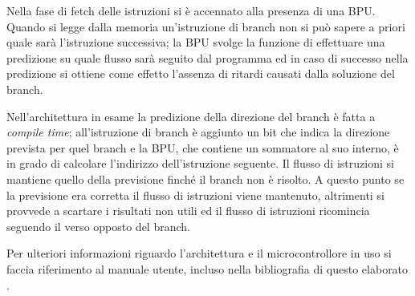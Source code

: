 Nella fase di fetch delle istruzioni si è accennato alla presenza di una BPU. Quando si legge dalla memoria un'istruzione di branch non si può sapere a priori quale sarà l'istruzione successiva; la BPU svolge la funzione di effettuare una predizione su quale flusso sarà seguito dal programma ed in caso di successo nella predizione si ottiene come effetto l'assenza di ritardi causati dalla soluzione del branch.

Nell'architettura in esame la predizione della direzione del branch è fatta a \textit{compile time}; all'istruzione di branch è aggiunto un bit che indica la direzione prevista per quel branch e la BPU, che contiene un sommatore al suo interno, è in grado di calcolare l'indirizzo dell'istruzione seguente. Il flusso di istruzioni si mantiene quello della previsione finché il branch non è risolto. A questo punto se la previsione era corretta il flusso di istruzioni viene mantenuto, altrimenti si provvede a scartare i risultati non utili ed il flusso di istruzioni ricomincia seguendo il verso opposto del branch.

Per ulteriori informazioni riguardo l'architettura e il microcontrollore in uso si faccia riferimento al manuale utente, incluso nella bibliografia di questo elaborato \cite{e300manual}.
